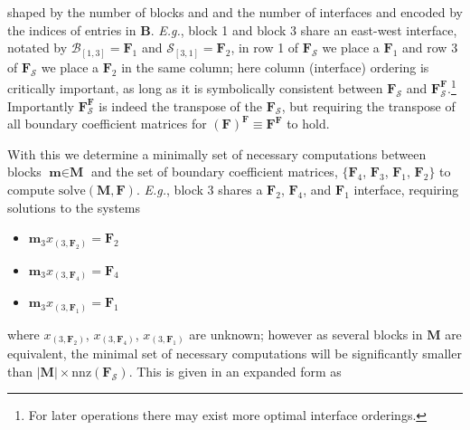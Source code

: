 \noindent
shaped by the number of blocks and and the number of interfaces and encoded by the indices of entries in $\textbf{B}$. \emph{E.g.}, block 1 and block 3 share an east-west interface, notated by $\mathcal{B}_{[1, 3]} = \textbf{F}_1$ and $\mathcal{S}_{[3, 1]} = \textbf{F}_{2}$, in row 1 of $\textbf{F}_{\mathcal{S}}$ we place a $\textbf{F}_1$ and row 3 of $\textbf{F}_{\mathcal{S}}$ we place a $\textbf{F}_{2}$ in the same column; here column (interface) ordering is critically important, as long as it is symbolically consistent between $\textbf{F}_{\mathcal{S}}$ and $\textbf{F}_{\mathcal{S}}^{\textbf{F}}$.\footnote{For later operations there may exist more optimal interface orderings.} Importantly $\textbf{F}_{\mathcal{S}}^{\textbf{F}}$ is indeed the transpose of the $\textbf{F}_{\mathcal{S}}$, but requiring the transpose of all boundary coefficient matrices for $(\textbf{F})^{\textbf{F}} \equiv \textbf{F}^{\textbf{F}}$ to hold.

With this we determine a minimally set of necessary computations between blocks $\textbf{m} \in \textbf{M}$ and the set of boundary coefficient matrices, $\{\textbf{F}_{4}$, $\textbf{F}_3$, $\textbf{F}_1$, $\textbf{F}_{2}\}$ to compute $\text{solve}(\textbf{M}, \textbf{F})$. \emph{E.g.}, block 3 shares a $\textbf{F}_{2}$, $\textbf{F}_{4}$, and $\textbf{F}_1$ interface, requiring solutions to the systems
\begin{itemize}
    \item $\textbf{m}_3 x_{(3,\textbf{F}_{2})} = \textbf{F}_{2}$
    \item $\textbf{m}_3 x_{(3,\textbf{F}_{4})} = \textbf{F}_{4}$
    \item $\textbf{m}_3 x_{(3,\textbf{F}_1)} = \textbf{F}_1$
\end{itemize}
\noindent 
where $x_{(3,\textbf{F}_{2})}$, $x_{(3,\textbf{F}_{4})}$, $x_{(3,\textbf{F}_1)}$ are unknown; however as several blocks in $\textbf{M}$ are equivalent, the minimal set of necessary computations will be significantly smaller than $|\textbf{M}| \times \text{nnz}(\textbf{F}_{\mathcal{S}})$. This is given in an expanded form as 

    
